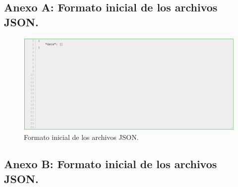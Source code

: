 \subsection*{Anexo A: Formato inicial de los archivos JSON.}  \label{Anexo A}
	\begin{figure}[H]
		\centering
		\includegraphics[width=1\textwidth]{images/Anexos/Formato_JSON.png}
		\caption[Formato inicial de los archivos JSON. ]{Formato inicial de los archivos JSON.}
		\label{Formato_json}
	\end{figure}

\subsection*{Anexo B: Formato inicial de los archivos JSON.}\label{hola} \caption{perro}